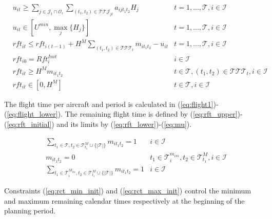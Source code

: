 \documentclass[a4paper,onecolumn,fleqn]{article}
\begin{document}
    \begin{align}
         & u_{it} \geq \sum_{j \in \mathcal{J}_t \cap \mathcal{O}_i} \sum_{(t_1, t_2) \in \mathcal{T}\mathcal{T}\mathcal{J}_{jt}} a_{ijt_1t_2} H_j 
            & t =1, ..., \mathcal{T}, i \in \mathcal{I} \label{eq:flight1}\\
         & u_{it} \in [U^{min}, \max_j{\{H_j\}}]
            & t =1, ..., \mathcal{T}, i \in \mathcal{I} \label{eq:flight_lower}\\
         & rft_{it} \leq rft_{i(t-1)} + H^M \sum_{(t_1, t_2) \in \mathcal{T}\mathcal{T}\mathcal{T}_{t}} m_{it_1t_2} - u_{it}
            & t =1, ..., \mathcal{T}, i \in \mathcal{I} \label{eq:rft_upper}\\
        & rft_{i0} = Rft^{Init}_i
               & i \in \mathcal{I} \label{eq:rft_initial}\\
        & rft_{it} \geq H^M m_{it_1t_2}
                &t \in \mathcal{T}, (t_1, t_2) \in \mathcal{T}\mathcal{T}\mathcal{T}_{t}, i \in \mathcal{I}\label{eq:rft_lower}\\
        & rft_{it} \in [0,H^M]
                & t \in \mathcal{T}, i \in \mathcal{I} \label{eq:mu}
    \end{align}

    The flight time per aircraft and period is calculated in (\ref{eq:flight1})-(\ref{eq:flight_lower}). The remaining flight time is defined by (\ref{eq:rft_upper})-(\ref{eq:rft_initial}) and its limits by (\ref{eq:rft_lower})-(\ref{eq:mu}).

    \begin{align}
        & \sum_{t_1 \in \mathcal{T}, t_2 \in \mathcal{T}^M_{t_1} \cup \{|\mathcal{T}|\} } m_{it_1t_2} =  1 
          & i \in \mathcal{I}\label{eq:num_maint} \\
        & m_{it_1t_2} = 0
          & t_1 \in \mathcal{T}^{m_{ini}}_i, t_2 \in \mathcal{T}^M_{t_1}, i \in \mathcal{I}\label{eq:rct_min_init} \\
        & \sum_{t_1 \in \mathcal{T}^{M_{ini}}_i, t_2 \in \mathcal{T}^M_{t_1} \cup \{|\mathcal{T}|\} } m_{it_1t_2} =  1 
          & i \in \mathcal{I}\label{eq:rct_max_init}
    \end{align}

    Constraints (\ref{eq:rct_min_init}) and (\ref{eq:rct_max_init}) control the minimum and maximum remaining calendar times respectively at the beginning of the planning period. 
\end{document}
